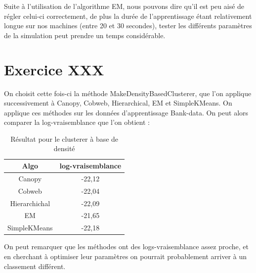 \documentclass[a4paper, 11pt]{report}
\begin{document}
        Suite à l'utilisation de l'algorithme EM, nous pouvons dire qu'il est peu aisé de régler celui-ci correctement, de plus la durée de l'apprentissage étant relativement longue sur nos machines (entre 20 et 30 secondes), tester les différents paramètres de la simulation peut prendre un temps considérable.
        
        \section{Exercice  XXX}
        On choisit cette fois-ci la méthode MakeDensityBasedClusterer, que l'on applique successivement à Canopy, Cobweb, Hierarchical, EM et SimpleKMeans. On applique ces méthodes sur les données d'apprentissage Bank-data. On peut alors comparer la log-vraisemblance que l'on obtient :
        
        \begin{table}[h!]
        \centering
        \begin{tabular}{| c | c |}
        \hline
         Algo & log-vraisemblance  \\
         \hline
         Canopy & -22,12 \\
         \hline
         Cobweb & -22,04 \\
         \hline
         Hierarchichal & -22,09\\
         \hline
         EM & -21,65\\
         \hline
         SimpleKMeans & -22,18\\
         \hline
        \end{tabular}
        \caption{Résultat pour le clusterer à base de densité}
        \label{tab:exo30}
        \end{table}
        
        On peut remarquer que les méthodes ont des logs-vraisemblance assez proche, et en cherchant à optimiser leur paramètres on pourrait probablement arriver à un classement différent.
\end{document}
